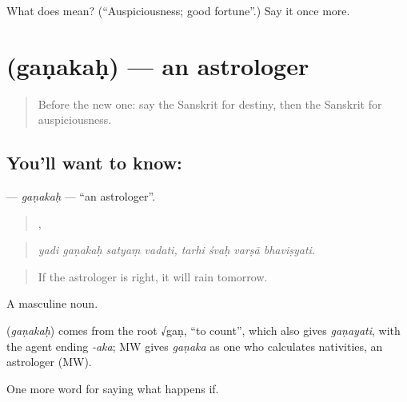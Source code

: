 \begin{tcolorbox}[breakable,colback=teal!4,colframe=teal!35!black,title={Before you move on}]
What does  mean? (\textquotedblleft{}Auspiciousness; good fortune\textquotedblright{}.) Say it once more.
\end{tcolorbox}
\section[\texorpdfstring{\sk{गणकः} (gaṇakaḥ)}{गणकः (gaṇakaḥ)}]{ (gaṇakaḥ) — an astrologer}

\label{lesson:SA-C538-ganakah}



\begin{quote}
Before the new one: say the Sanskrit for destiny, then the Sanskrit for auspiciousness.
\end{quote}

\subsection*{You'll want to know: }
\textbf{} — \emph{gaṇakaḥ} — \textquotedblleft{}an astrologer\textquotedblright{}.

\begin{quote}
   ,    
\end{quote}

\begin{quote}
\emph{yadi gaṇakaḥ satyaṃ vadati, tarhi śvaḥ varṣā bhaviṣyati.}
\end{quote}

\begin{quote}
If the astrologer is right, it will rain tomorrow.
\end{quote}

A masculine noun.

\begin{cousinweb}
\textbf{} (\emph{gaṇakaḥ}) comes from the root √gaṇ, \textquotedblleft{}to count\textquotedblright{}, which also gives \emph{gaṇayati}, with the agent ending \emph{-aka}; MW gives \emph{gaṇaka} as one who calculates nativities, an astrologer (MW).
\end{cousinweb}

\begin{grammarlens}[title={What you've built}]
One more word for saying what happens if.
\end{grammarlens}

